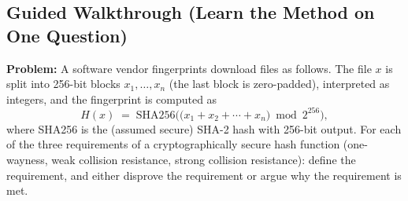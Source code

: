 \documentclass[12pt, a4paper]{article}
\begin{document}
\subsection*{Guided Walkthrough (Learn the Method on One Question)}
\textbf{Problem:} A software vendor fingerprints download files as follows. The file $x$ is split into 256-bit blocks $x_1, \dots, x_n$ (the last block is zero-padded), interpreted as integers, and the fingerprint is computed as
\[ H(x) \;=\; \mathrm{SHA256}\Big( \big(x_1 + x_2 + \cdots + x_n\big) \bmod 2^{256} \Big), \]
where SHA256 is the (assumed secure) SHA-2 hash with 256-bit output. For each of the three requirements of a cryptographically secure hash function (one-wayness, weak collision resistance, strong collision resistance): define the requirement, and either disprove the requirement or argue why the requirement is met.
\end{document}
